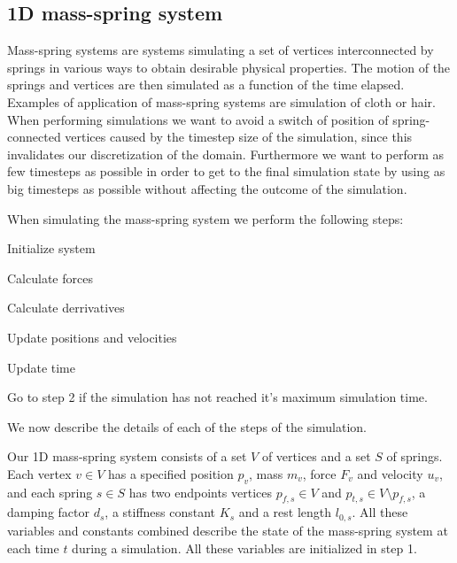 \documentclass[twoside]{article}
\begin{document}
\begin{multicols}{2}
\subsection{1D mass-spring system} Mass-spring systems are systems simulating
a set of vertices interconnected by springs in various ways to obtain
desirable physical properties. The motion of the springs and vertices are
then simulated as a function of the time elapsed. Examples of application of
mass-spring systems are simulation of cloth or hair. When performing simulations
we want to avoid a switch of position of spring-connected vertices caused by the
timestep size of the simulation, since this invalidates our discretization of
the domain. Furthermore we want to perform as few timesteps as possible in order
to get to the final simulation state by using as big timesteps as possible
without affecting the outcome of the simulation.

When simulating the mass-spring system we perform the following steps:
\begin{compactenum} \item Initialize system \item Calculate forces \item
Calculate derrivatives \item Update positions and velocities \item Update time
\item Go to step 2 if the simulation has not reached it's maximum simulation
time. \end{compactenum} We now describe the details of each of the steps of
the simulation.

Our 1D mass-spring system consists of a set $V$ of vertices and a set
$S$ of springs. Each vertex $v \in V$ has a specified position $p_v$,
mass $m_v$, force $F_v$ and velocity $u_v$, and each spring $s \in S$
has two endpoints vertices $p_{f,s} \in V$ and $p_{t,s} \in V \setminus
p_{f,s}$, a damping factor $d_s$, a stiffness constant $K_s$ and a rest length
$l_{0,s}$. All these variables and constants combined describe the state
of the mass-spring system at each time $t$ during a simulation. All these
variables are initialized in step 1.


\end{multicols}
\end{document}
